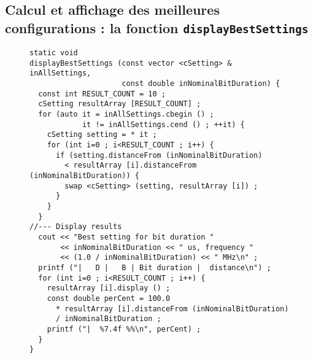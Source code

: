  

\subsection{Calcul et affichage des meilleures configurations : la fonction \texttt{displayBestSettings}}




\begin{figure}[!ht]
\begin{lstlisting}
static void
displayBestSettings (const vector <cSetting> & inAllSettings,
                     const double inNominalBitDuration) {
  const int RESULT_COUNT = 10 ;
  cSetting resultArray [RESULT_COUNT] ;
  for (auto it = inAllSettings.cbegin () ;
            it != inAllSettings.cend () ; ++it) {
    cSetting setting = * it ;
    for (int i=0 ; i<RESULT_COUNT ; i++) {
      if (setting.distanceFrom (inNominalBitDuration)
        < resultArray [i].distanceFrom (inNominalBitDuration)) {
        swap <cSetting> (setting, resultArray [i]) ;
      }
    }
  }
//--- Display results
  cout << "Best setting for bit duration "
       << inNominalBitDuration << " us, frequency "
       << (1.0 / inNominalBitDuration) << " MHz\n" ;
  printf ("|   D |   B | Bit duration |  distance\n") ;
  for (int i=0 ; i<RESULT_COUNT ; i++) {
    resultArray [i].display () ;
    const double perCent = 100.0
      * resultArray [i].distanceFrom (inNominalBitDuration)
      / inNominalBitDuration ;
    printf ("|  %7.4f %%\n", perCent) ;
  }
}
\end{lstlisting}
\end{figure}






